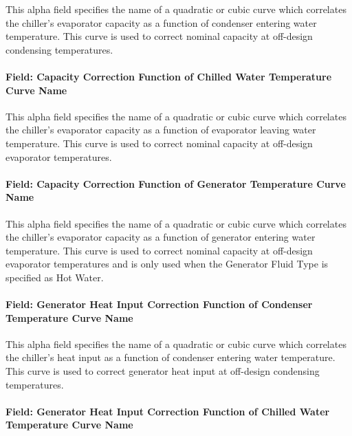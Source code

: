 This alpha field specifies the name of a quadratic or cubic curve which correlates the chiller's evaporator capacity as a function of condenser entering water temperature. This curve is used to correct nominal capacity at off-design condensing temperatures.

\paragraph{Field: Capacity Correction Function of Chilled Water Temperature Curve Name}\label{field-capacity-correction-function-of-chilled-water-temperature-curve-name}

This alpha field specifies the name of a quadratic or cubic curve which correlates the chiller's evaporator capacity as a function of evaporator leaving water temperature. This curve is used to correct nominal capacity at off-design evaporator temperatures.

\paragraph{Field: Capacity Correction Function of Generator Temperature Curve Name}\label{field-capacity-correction-function-of-generator-temperature-curve-name}

This alpha field specifies the name of a quadratic or cubic curve which correlates the chiller's evaporator capacity as a function of generator entering water temperature. This curve is used to correct nominal capacity at off-design evaporator temperatures and is only used when the Generator Fluid Type is specified as Hot Water.

\paragraph{Field: Generator Heat Input Correction Function of Condenser Temperature Curve Name}\label{field-generator-heat-input-correction-function-of-condenser-temperature-curve-name}

This alpha field specifies the name of a quadratic or cubic curve which correlates the chiller's heat input as a function of condenser entering water temperature. This curve is used to correct generator heat input at off-design condensing temperatures.

\paragraph{Field: Generator Heat Input Correction Function of Chilled Water Temperature Curve Name}\label{field-generator-heat-input-correction-function-of-chilled-water-temperature-curve-name}

